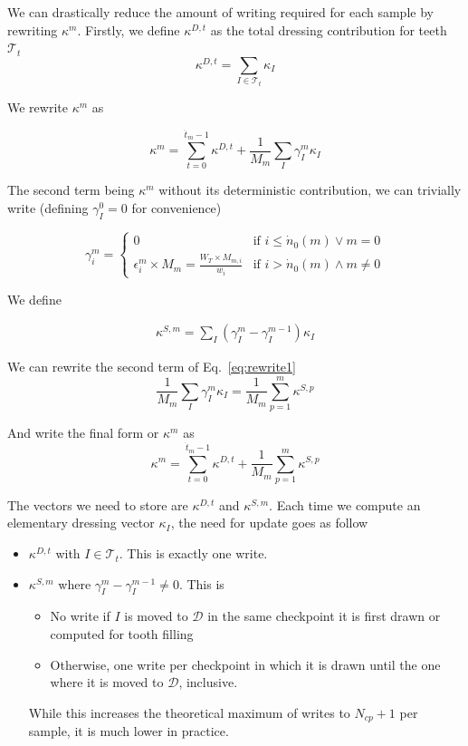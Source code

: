 \documentclass[./thesis.tex]{subfiles}
\begin{document}
We can drastically reduce the amount of writing required for each sample by rewriting $\kappa^m$.
Firstly, we define $\kappa^{D,t}$ as the total dressing contribution for teeth $\mathcal{T}_t$
\begin{equation}
\kappa^{D,t} = \sum_{I \in \mathcal{T}_t} \kappa_I
\end{equation}

We rewrite $\kappa^m$ as

\begin{equation}
\label{eq:rewrite1}
\kappa^{m} = \sum_{t=0}^{\dot t_m - 1} \kappa^{D,t}+ \frac{1}{M_m} \sum_{I} \gamma^m_{I} \kappa_I
\end{equation}

The second term being $\kappa^m$ without its deterministic contribution, we can trivially write (defining $\gamma^ 0_I=0$ for convenience)

\begin{equation}
\gamma^m_i = 
\begin{cases}
0 & \text{if } i \leq \dot n_0(m) \vee m=0 \\
\epsilon^m_i \times M_m = \frac{W_T \times M_{m,i}}{w_i} & \text{if } i > \dot n_0(m) \wedge m \neq 0
\end{cases}
\end{equation}

We define

\begin{align}
\kappa^{S,m} = \sum_I (\gamma^m_I - \gamma^{m-1}_I) \kappa_I
\end{align}


We can rewrite the second term of Eq.~\eqref{eq:rewrite1}
\begin{equation}
\frac{1}{M_m}\sum_{I} \gamma^m_{I} \kappa_I = \frac{1}{M_m} \sum_{p=1}^m \kappa^{S,p}
\end{equation}

And write the final form or $\kappa^m$ as
\begin{equation}
\kappa^m=\sum_{t=0}^{\dot t_{m}-1} \kappa^{D,t} + \frac{1}{M_m} \sum_{p=1}^m \kappa^{S,p}
\end{equation}

The vectors we need to store are $\kappa^{D,t}$ and $\kappa^{S,m}$. Each time we compute an elementary dressing vector $\kappa_I$, the need for update goes as follow

\begin{itemize}
\item
$\kappa^{D,t}$ with $I \in \mathcal{T}_t$. This is exactly one write.
\item
$\kappa^{S,m}$ where $\gamma^m_I - \gamma^{m-1}_I \neq 0$. This is
 \begin{itemize}
 \item
 	No write if $I$ is moved to $\mathcal{D}$ in the same checkpoint it is first drawn or computed for tooth filling
 \item
 	Otherwise, one write per checkpoint in which it is drawn until the one where it is moved to $\mathcal{D}$, inclusive.
 \end{itemize}
 While this increases the theoretical maximum of writes to $N_{cp}+1$ per sample, it is much lower in practice.
\end{itemize}
\end{document}
